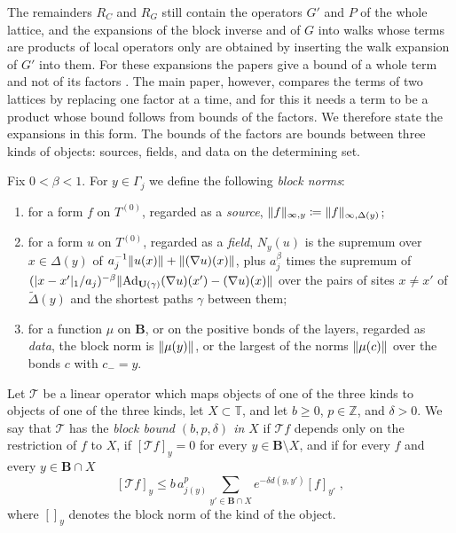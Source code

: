 \documentclass[11pt]{preprint}
\makeatletter
\newcommand{\Ad}{\operatorname{Ad}}
\DeclarePairedDelimiter{\abs}{\lvert}{\rvert}
\DeclarePairedDelimiter{\norm}{\lVert}{\rVert}
\newcommand*{\bigcdot}{}%
\DeclareRobustCommand*{\bigcdot}{%
	\mathbin{\mathpalette\bigcdot@{}}%
}
\newcommand*{\bigcdot@scalefactor}{.7}
\newcommand*{\bigcdot@widthfactor}{1.15}
\newcommand*{\bigcdot@}[2]{%
	\sbox0{$#1\vcenter{}$}%
	\sbox2{$#1\cdot\m@th$}%
	\hbox to \bigcdot@widthfactor\wd2{%
		\hss
		\raise\ht0\hbox{%
			\scalebox{\bigcdot@scalefactor}{%
				\lower\ht0\hbox{$#1\bullet\m@th$}%
			}%
		}%
		\hss
	}%
}
\numberwithin{equation}{section}
\makeatother
\begin{document}
The remainders $R_C$ and $R_G$ still contain the operators $G'$ and $P$ of the whole lattice, and the expansions of the block inverse and of $G$ into walks whose terms are products of local operators only \cite[Theorems~3.9, 3.10]{BalabanPBG} are obtained by inserting the walk expansion of $G'$ into them. For these expansions the papers give a bound of a whole term and not of its factors \cite[p.~413]{BalabanPBG}. The main paper, however, compares the terms of two lattices by replacing one factor at a time, and for this it needs a term to be a product whose bound follows from bounds of the factors. We therefore state the expansions in this form. The bounds of the factors are bounds between three kinds of objects: sources, fields, and data on the determining set.

\begin{definition}\label{def:block-bounds}
Fix $0 < \beta < 1$. For $y \in \Gamma_j$ we define the following \emph{block norms}:
\begin{enumerate}[label=(\roman*)]
\item for a form $f$ on $T^{(0)}$, regarded as a \emph{source}, $\norm f_{\infty,y} \coloneqq \norm f_{\infty,\Delta(y)}$;
\item for a form $u$ on $T^{(0)}$, regarded as a \emph{field}, $N_y(u)$ is the supremum over $x \in \Delta(y)$ of $a_j^{-1}\norm{u(x)} + \norm{(\nabla u)(x)}$, plus $a_j^\beta$ times the supremum of $(\abs{x - x'}_1/a_j)^{-\beta}\norm{\Ad_{\mathbf U(\gamma)}(\nabla u)(x') - (\nabla u)(x)}$ over the pairs of sites $x \neq x'$ of $\tilde\Delta(y)$ and the shortest paths $\gamma$ between them;
\item for a function $\mu$ on $\mathbf B$, or on the positive bonds of the layers, regarded as \emph{data}, the block norm is $\norm{\mu(y)}$, or the largest of the norms $\norm{\mu(c)}$ over the bonds $c$ with $c_- = y$.
\end{enumerate}
Let $\mathcal T$ be a linear operator which maps objects of one of the three kinds to objects of one of the three kinds, let $X \subset \mathbb T$, and let $b \geqslant 0$, $p \in \mathbb Z$, and $\delta > 0$. We say that $\mathcal T$ has the \emph{block bound $(b, p, \delta)$ in $X$} if $\mathcal Tf$ depends only on the restriction of $f$ to $X$, if $[\mathcal Tf]_y = 0$ for every $y \in \mathbf B \setminus X$, and if for every $f$ and every $y \in \mathbf B \cap X$
\begin{equation}\label{eq:block-bound}
    [\mathcal Tf]_y \leqslant b\,a_{j(y)}^p\sum_{y' \in \mathbf B \cap X}e^{-\delta d(y, y')}[f]_{y'}\;,
\end{equation}
where $[\bigcdot]_y$ denotes the block norm of the kind of the object.
\end{definition}
\end{document}
